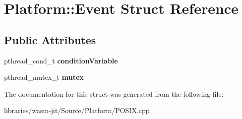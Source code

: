 \hypertarget{struct_platform_1_1_event}{}\section{Platform\+:\+:Event Struct Reference}
\label{struct_platform_1_1_event}
\subsection*{Public Attributes}
\begin{DoxyCompactItemize}
\item 
\mbox{\label{struct_platform_1_1_event_a5d45bde2424607ce704eb72dde1dd070}} 
pthread\+\_\+cond\+\_\+t {\bfseries condition\+Variable}
\item 
\mbox{\label{struct_platform_1_1_event_a27a6834f40a8459ad57ac845358ad6ad}} 
pthread\+\_\+mutex\+\_\+t {\bfseries mutex}
\end{DoxyCompactItemize}


The documentation for this struct was generated from the following file\+:\begin{DoxyCompactItemize}
\item 
libraries/wasm-\/jit/\+Source/\+Platform/P\+O\+S\+I\+X.\+cpp\end{DoxyCompactItemize}
